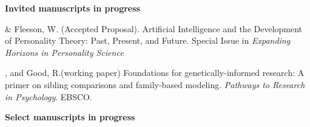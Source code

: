 {\large \textbf{Invited manuscripts in progress}}
\begin{etaremune}


\item \meb \& Fleeson, W. (Accepted Proposal). Artificial Intelligence and the Development of Personality Theory: Past, Present, and Future. Special Issue in \textit{Expanding Horizons in Personality Science}


\item \meb, and Good, R.\noteA (working paper) Foundations for genetically-informed research: A primer on sibling comparisons and family-based modeling. \textit{Pathways to Research in Psychology}. EBSCO.
\end{etaremune}
%



{\large \textbf{Select manuscripts in progress}}

